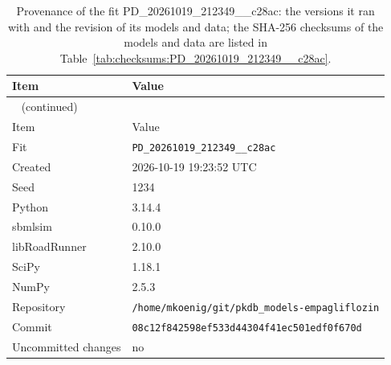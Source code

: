 \documentclass{article}
\begin{document}
\begin{longtable}{ll}
\caption{Provenance of the fit PD\_20261019\_212349\_\_c28ac: the versions it ran with and the revision of its models and data; the SHA-256 checksums of the models and data are listed in Table~\ref{tab:checksums:PD_20261019_212349__c28ac}.}\label{tab:provenance:PD_20261019_212349__c28ac} \\
\toprule
Item & Value \\
\midrule
\endfirsthead
\multicolumn{2}{l}{\small\tablename~\thetable{} (continued)} \\
\toprule
Item & Value \\
\midrule
\endhead
\bottomrule
\endlastfoot
Fit & \texttt{PD\_20261019\_212349\_\_c28ac} \\
Created & 2026-10-19 19:23:52 UTC \\
Seed & 1234 \\
Python & 3.14.4 \\
sbmlsim & 0.10.0 \\
libRoadRunner & 2.10.0 \\
SciPy & 1.18.1 \\
NumPy & 2.5.3 \\
Repository & \texttt{/home/mkoenig/git/pkdb\_models-empagliflozin} \\
Commit & \texttt{08c12f842598ef533d44304f41ec501edf0f670d} \\
Uncommitted changes & no \\
\end{longtable}



\end{document}
